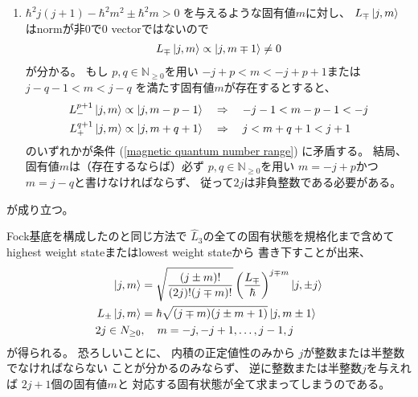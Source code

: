 \begin{enumerate}
{    }
    \item{
        $\hbar^2 j (j+1) - \hbar^2 m^2 \pm \hbar^2 m > 0$
        を与えるような固有値$m$に対し、
        $ L_\mp \ket{ j, m } $
        はnormが非0で$0$ vectorではないので
        \begin{align}
            L_\mp \ket{ j, m } \propto \ket{ j, m \mp 1 } \neq 0
        \end{align}
        が分かる。
        もし
        $p, q \in \mathbb{N}_{\ge0}$を用い
        $- j + p < m < - j + p + 1$または
        $j - q - 1 < m < j - q$
        を満たす固有値$m$が存在するとすると、
        \begin{subequations}
        \begin{align}
            L_-^{p+1} \ket{ j, m }
            \propto \ket{ j, m - p - 1}
        \quad&\Rightarrow\quad
            - j - 1 < m - p - 1 < -j
        \\
            L_+^{q+1} \ket{ j, m }
            \propto \ket{ j, m + q + 1}
        \quad&\Rightarrow\quad
            j < m + q + 1 < j + 1
        \end{align}
        \end{subequations}
        のいずれかが条件
        (\ref{magnetic quantum number range})
        に矛盾する。
        結局、固有値$m$は（存在するならば）必ず
        $p, q \in \mathbb{N}_{\ge0}$を用い
        $m = - j + p$かつ$ m = j - q$と書けなければならず、
        従って$ 2j $は非負整数である必要がある。
    }
\end{enumerate}
が成り立つ。

Fock基底を構成したのと同じ方法で
$\hat{L}_3$の全ての固有状態を規格化まで含めて
highest weight stateまたはlowest weight stateから
書き下すことが出来、
\begin{subequations}
\begin{align}
    \ket{ j, m }
    &=
    \sqrt{\dfrac{
        (j \pm m)!
    }{
        (2j)! (j \mp m)!
    }}
    \left(
        \dfrac{L_\mp}{\hbar}
    \right)^{j \mp m}
    \ket{ j, \pm j }
\\
    L_\pm \ket{ j, m }
    &= \hbar
    \sqrt{(j \mp m)(j \pm m + 1)}
    \ket{ j, m \pm 1 }
\\
    2j \in N_{\ge0}
    &,\quad
    m = - j, - j + 1, \dots, j - 1, j
\end{align}
\end{subequations}
が得られる。
恐ろしいことに、
内積の正定値性のみから
$j$が整数または半整数でなければならない
ことが分かるのみならず、
逆に整数または半整数$j$を与えれば
$2j +1$個の固有値$m$と
対応する固有状態が全て求まってしまうのである。


